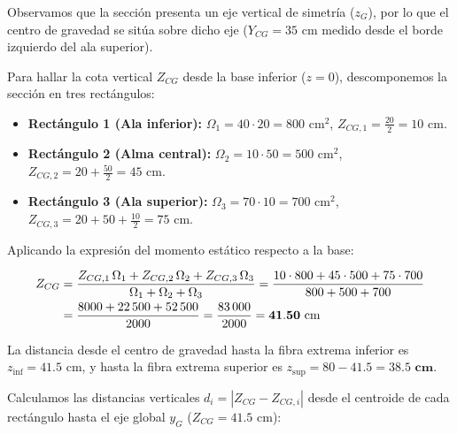 {    



    Observamos que la sección presenta un eje vertical de simetría ($z_G$), por lo que el centro de gravedad se sitúa sobre dicho eje ($Y_{CG} = 35\text{ cm}$ medido desde el borde izquierdo del ala superior).



    Para hallar la cota vertical $Z_{CG}$ desde la base inferior ($z = 0$), descomponemos la sección en tres rectángulos:

    \begin{itemize}

        \item \textbf{Rectángulo 1 (Ala inferior):} $\Omega_1 = 40 \cdot 20 = 800\text{ cm}^2$, \quad $Z_{CG,1} = \frac{20}{2} = 10\text{ cm}$.

        \item \textbf{Rectángulo 2 (Alma central):} $\Omega_2 = 10 \cdot 50 = 500\text{ cm}^2$, \quad $Z_{CG,2} = 20 + \frac{50}{2} = 45\text{ cm}$.

        \item \textbf{Rectángulo 3 (Ala superior):} $\Omega_3 = 70 \cdot 10 = 700\text{ cm}^2$, \quad $Z_{CG,3} = 20 + 50 + \frac{10}{2} = 75\text{ cm}$.

    \end{itemize}

    Aplicando la expresión del momento estático respecto a la base:

    \begin{align}
        Z_{CG} & = \frac{Z_{CG,1}\,\Omega_1 + Z_{CG,2}\,\Omega_2 + Z_{CG,3}\,\Omega_3}{\Omega_1 + \Omega_2 + \Omega_3} = \frac{10 \cdot 800 + 45 \cdot 500 + 75 \cdot 700}{800 + 500 + 700} \notag \\
               & = \frac{8000 + 22\,500 + 52\,500}{2000} = \frac{83\,000}{2000} = \mathbf{41.50\text{ cm}}
\end{align}

    La distancia desde el centro de gravedad hasta la fibra extrema inferior es $z_{\text{inf}} = 41.5\text{ cm}$, y hasta la fibra extrema superior es $z_{\text{sup}} = 80 - 41.5 = \mathbf{38.5\text{ cm}}$.






    Calculamos las distancias verticales $d_i = |Z_{CG} - Z_{CG,i}|$ desde el centroide de cada rectángulo hasta el eje global $y_G$ ($Z_{CG} = 41.5\text{ cm}$):

}
